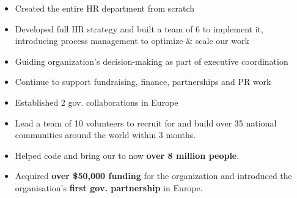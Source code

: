 \documentclass[10pt,a4paper,ragged2e,withhyper]{altacv}
\begin{document}
\begin{paracol}{2}


\begin{itemize}
    \item Created the entire HR department from scratch
    \item Developed full HR strategy and built a team of 6 to implement it, introducing process management to optimize \& scale our work
    \item Guiding organization's decision-making as part of executive coordination
    \item Continue to support fundraising, finance, partnerships and PR work
\end{itemize}

\divider

\begin{itemize}
    \item Established 2 gov. collaborations in Europe
    \item Lead a team of 10 volunteers to recruit for and build over 35 national communities around the world within 3 months.
\end{itemize}

\divider

\begin{itemize}
    \item Helped code and bring our  to now  \textbf{over 8 million people}.
    \item Acquired \textbf{over \$50,000 funding} for the organization and introduced the organisation's \textbf{first gov. partnership} in Europe.
\end{itemize}



\end{paracol}
\end{document}
